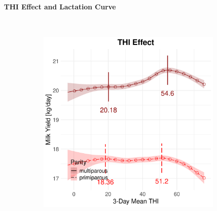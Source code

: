\paragraph{THI Effect and Lactation Curve} \quad \\
\begin{figure}[H]
    \centering
    \begin{subfigure}[b]{0.45\textwidth}
        \centering
        \includegraphics[width=\textwidth]{thesis/figures/models/milk/full/ob_milk_full/ob_milk_full_marginal_thi_milk_combined.png}
    \end{subfigure}
    \hspace{0.05\textwidth} %
    \begin{subfigure}[b]{0.45\textwidth}
        \centering

\end{subfigure}
\end{figure}

